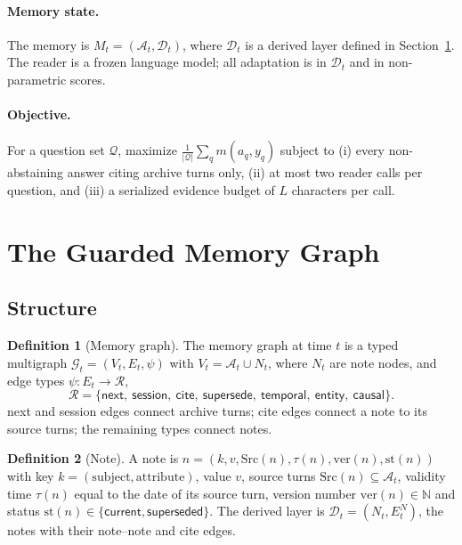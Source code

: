 \documentclass[10pt]{article}
\theoremstyle{plain}
\theoremstyle{definition}
\newtheorem{definition}{Definition}
\theoremstyle{remark}
\newcommand{\A}{\mathcal{A}}
\newcommand{\D}{\mathcal{D}}
\newcommand{\G}{\mathcal{G}}
\newcommand{\Rset}{\mathcal{R}}
\begin{document}
\paragraph{Memory state.}
The memory is $M_t=(\A_t,\D_t)$, where $\D_t$ is a derived layer defined in
Section~\ref{sec:graph}. The reader is a frozen language model; all adaptation is in $\D_t$
and in non-parametric scores.

\paragraph{Objective.}
For a question set $\mathcal{Q}$, maximize $\frac{1}{|\mathcal{Q}|}\sum_{q}m(a_q,y_q)$
subject to (i) every non-abstaining answer citing archive turns only, (ii) at most
two reader calls per question, and (iii) a serialized evidence budget of $L$
characters per call.

\section{The Guarded Memory Graph}
\label{sec:graph}

\subsection{Structure}

\begin{definition}[Memory graph]
\label{def:graph}
The memory graph at time $t$ is a typed multigraph $\G_t=(V_t,E_t,\psi)$ with
$V_t=\A_t\cup N_t$, where $N_t$ are note nodes, and edge types
$\psi:E_t\to\Rset$,
\[
\Rset=\{\textsf{next},\ \textsf{session},\ \textsf{cite},\ \textsf{supersede},\ \textsf{temporal},\ \textsf{entity},\ \textsf{causal}\}.
\]
\textsf{next} and \textsf{session} edges connect archive turns; \textsf{cite} edges
connect a note to its source turns; the remaining types connect notes.
\end{definition}

\begin{definition}[Note]
\label{def:note}
A note is $n=(k,v,\mathrm{Src}(n),\tau(n),\mathrm{ver}(n),\mathrm{st}(n))$ with key
$k=(\text{subject},\text{attribute})$, value $v$, source turns
$\mathrm{Src}(n)\subseteq\A_t$, validity time $\tau(n)$ equal to the date of its
source turn, version number $\mathrm{ver}(n)\in\mathbb{N}$ and status
$\mathrm{st}(n)\in\{\textsf{current},\textsf{superseded}\}$. The derived layer is
$\D_t=(N_t,E_t^{N})$, the notes with their note--note and \textsf{cite} edges.
\end{definition}
\end{document}
